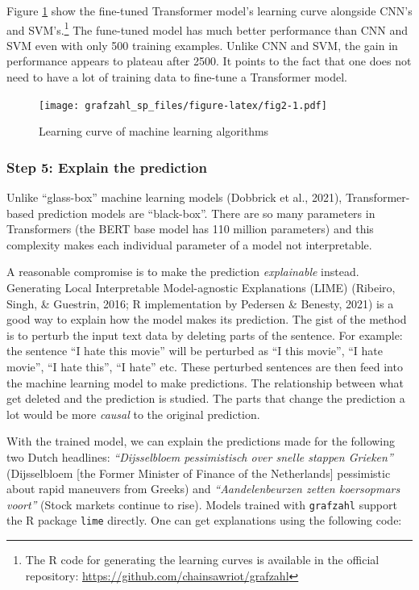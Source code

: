 \documentclass[
  english,
  man,floatsintext]{apa6}
\begin{document}
Figure \ref{fig:fig2} show the fine-tuned Transformer model's learning curve alongside CNN's and SVM's.\footnote{The R code for generating the learning curves is available in the official repository: \url{https://github.com/chainsawriot/grafzahl}} The fune-tuned model has much better performance than CNN and SVM even with only 500 training examples. Unlike CNN and SVM, the gain in performance appears to plateau after 2500. It points to the fact that one does not need to have a lot of training data to fine-tune a Transformer model.

\begin{figure}
\centering
\texttt{[image: grafzahl\_sp\_files/figure-latex/fig2-1.pdf]}
\caption{\label{fig:fig2}Learning curve of machine learning algorithms}
\end{figure}

\hypertarget{step-5-explain-the-prediction}{%
\subsubsection{Step 5: Explain the prediction}\label{step-5-explain-the-prediction}}

Unlike ``glass-box'' machine learning models (Dobbrick et al., 2021), Transformer-based prediction models are ``black-box''. There are so many parameters in Transformers (the BERT base model has 110 million parameters) and this complexity makes each individual parameter of a model not interpretable.

A reasonable compromise is to make the prediction \emph{explainable} instead. Generating Local Interpretable Model-agnostic Explanations (LIME) (Ribeiro, Singh, \& Guestrin, 2016; R implementation by Pedersen \& Benesty, 2021) is a good way to explain how the model makes its prediction. The gist of the method is to perturb the input text data by deleting parts of the sentence. For example: the sentence ``I hate this movie'' will be perturbed as ``I this movie'', ``I hate movie'', ``I hate this'', ``I hate'' etc. These perturbed sentences are then feed into the machine learning model to make predictions. The relationship between what get deleted and the prediction is studied. The parts that change the prediction a lot would be more \emph{causal} to the original prediction.

With the trained model, we can explain the predictions made for the following two Dutch headlines: \emph{``Dijsselbloem pessimistisch over snelle stappen Grieken''} (Dijsselbloem {[}the Former Minister of Finance of the Netherlands{]} pessimistic about rapid maneuvers from Greeks) and \emph{``Aandelenbeurzen zetten koersopmars voort''} (Stock markets continue to rise). Models trained with \texttt{grafzahl} support the R package \texttt{lime} directly. One can get explanations using the following code:
\end{document}
